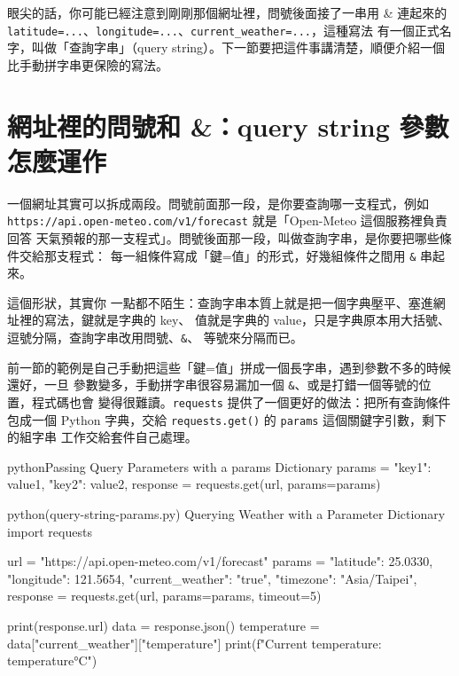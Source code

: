 眼尖的話，你可能已經注意到剛剛那個網址裡，問號後面接了一串用 \& 連起來的
\texttt{latitude=...}、\texttt{longitude=...}、\texttt{current\_weather=...}，這種寫法
有一個正式名字，叫做「查詢字串」（query string）。下一節要把這件事講清楚，順便介紹一個
比手動拼字串更保險的寫法。

\section{網址裡的問號和 \&：query string 參數怎麼運作}
\label{sec:query-strings}

一個網址其實可以拆成兩段。問號前面那一段，是你要查詢哪一支程式，例如
\texttt{https://api.open-meteo.com/v1/forecast} 就是「Open-Meteo 這個服務裡負責回答
天氣預報的那一支程式」。問號後面那一段，叫做查詢字串，是你要把哪些條件交給那支程式：
每一組條件寫成「鍵=值」的形式，好幾組條件之間用 \texttt{\&} 串起來。

這個形狀，其實你
一點都不陌生：查詢字串本質上就是把一個字典壓平、塞進網址裡的寫法，鍵就是字典的 key、
值就是字典的 value，只是字典原本用大括號、逗號分隔，查詢字串改用問號、\texttt{\&}、
等號來分隔而已。

前一節的範例是自己手動把這些「鍵=值」拼成一個長字串，遇到參數不多的時候還好，一旦
參數變多，手動拼字串很容易漏加一個 \texttt{\&}、或是打錯一個等號的位置，程式碼也會
變得很難讀。\texttt{requests} 提供了一個更好的做法：把所有查詢條件包成一個 Python
字典，交給 \texttt{requests.get()} 的 \texttt{params} 這個關鍵字引數，剩下的組字串
工作交給套件自己處理。

\begin{code}{python}{Passing Query Parameters with a params Dictionary}
params = {
    "key1": value1,
    "key2": value2,
}
response = requests.get(url, params=params)
\end{code}

\begin{example}{python}{(query-string-params.py) Querying Weather with a Parameter Dictionary}
import requests

url = "https://api.open-meteo.com/v1/forecast"
params = {
    "latitude": 25.0330,
    "longitude": 121.5654,
    "current_weather": "true",
    "timezone": "Asia/Taipei",
}
response = requests.get(url, params=params, timeout=5)

print(response.url)
data = response.json()
temperature = data["current_weather"]["temperature"]
print(f"Current temperature: {temperature}°C")
\end{example}

